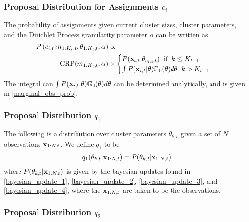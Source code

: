 \documentclass[smallcondensed, final]{svjour3}
\begin{document}
\subsubsection{Proposal Distribution for Assignments $c_{i}$}
\label{sec:smc_proposal_1}

The probability of assignments given current cluster sizes, cluster parameters, and the Dirichlet Process granularity parameter $\alpha$ can be written as
\begin{equation}
\label{smc_assig_eqn}
\begin{split}
P \left( c_{i,t} | m_{1:K_{t}, t}, \theta_{1:K_{t}, t}, \alpha \right) &\propto\\
\text{CRP}(m_{1:K_{t}, t}, \alpha) &\times
\begin{cases}
P(\bold{x}_{i,t} | \theta_{c_{i,t},t}) \hspace{2mm} \text{if} \hspace{2mm} k \leq K_{t-1} \\
\int P(\bold{x}_{i,t} | \theta) \mathbb{G}_{0}(\theta)d\theta \hspace{2mm} k > K_{t-1}
\end{cases}
\end{split}
\end{equation}
The integral can $\int P(\bold{x}_{i,t} | \theta) \mathbb{G}_{0}(\theta)d\theta$ can be determined analytically, and is given in \eqref{marginal_obs_prob}.





\subsubsection{Proposal Distribution $q_{1}$}
\label{sec:smc_proposal_2}

The following is a distribution over cluster parameters $\theta_{k,t}$ given a set of $N$ observations $\bold{x}_{1:N, t}$. We define $q_{1}$ to be
\begin{equation}
\label{smc_q1_eqn}
q_{1}(\theta_{k,t} | \bold{x}_{1:N,t}) = P(\theta_{k,t} | \bold{x}_{1:N,t})
\end{equation}
where $P(\theta_{k,t} | \bold{x}_{1:N,t})$ is given by the bayesian updates found in \eqref{bayesian_update_1}, \eqref{bayesian_update_2}, \eqref{bayesian_update_3}, and \eqref{bayesian_update_4}, where the $\bold{x}_{1:N,t}$ are taken to be the observations.





\subsubsection{Proposal Distribution $q_{2}$}
\label{sec:smc_proposal_3}
\end{document}
